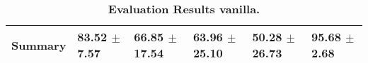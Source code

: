 \begin{table}[htb]
{\begin{tabular}{llllll}
\midrule
\textbf{Summary                                  } &        \phantom{0}83.52 $\pm$ \phantom{0}7.57 &                      \phantom{0}66.85 $\pm$ 17.54 &                  \phantom{0}63.96 $\pm$ 25.10 &            \phantom{0}50.28 $\pm$ 26.73 &  \phantom{0}95.68 $\pm$ \phantom{0}2.68 \\
\bottomrule
\end{tabular}%
}
\caption{\textbf{Evaluation Results vanilla.}}
\label{tab:eval-results}
\end{table}


